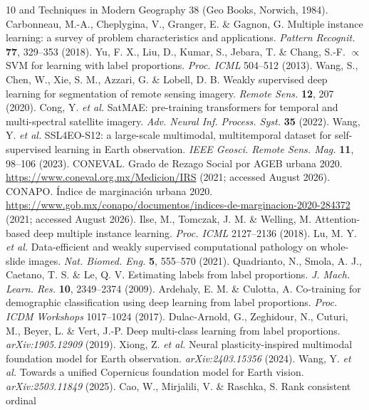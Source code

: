 \documentclass[11pt]{article}
\begin{document}
\begin{thebibliography}{10}
and Techniques in Modern Geography 38 (Geo Books, Norwich, 1984).
 Carbonneau, M.-A., Cheplygina, V., Granger, E. \& Gagnon, G.
Multiple instance learning: a survey of problem characteristics and applications.
\emph{Pattern Recognit.} \textbf{77}, 329--353 (2018).
 Yu, F. X., Liu, D., Kumar, S., Jebara, T. \& Chang, S.-F. $\propto$SVM
for learning with label proportions. \emph{Proc. ICML} 504--512 (2013).
 Wang, S., Chen, W., Xie, S. M., Azzari, G. \& Lobell, D. B. Weakly
supervised deep learning for segmentation of remote sensing imagery. \emph{Remote Sens.}
\textbf{12}, 207 (2020).
 Cong, Y. \emph{et al.} SatMAE: pre-training transformers for temporal
and multi-spectral satellite imagery. \emph{Adv. Neural Inf. Process. Syst.} \textbf{35}
(2022).
 Wang, Y. \emph{et al.} SSL4EO-S12: a large-scale multimodal,
multitemporal dataset for self-supervised learning in Earth observation. \emph{IEEE
Geosci. Remote Sens. Mag.} \textbf{11}, 98--106 (2023).
 CONEVAL. Grado de Rezago Social por AGEB urbana 2020.
\url{https://www.coneval.org.mx/Medicion/IRS} (2021; accessed August 2026).
 CONAPO. \'Indice de marginaci\'on urbana 2020.
\url{https://www.gob.mx/conapo/documentos/indices-de-marginacion-2020-284372} (2021;
accessed August 2026).
 Ilse, M., Tomczak, J. M. \& Welling, M. Attention-based deep multiple
instance learning. \emph{Proc. ICML} 2127--2136 (2018).
 Lu, M. Y. \emph{et al.} Data-efficient and weakly supervised
computational pathology on whole-slide images. \emph{Nat. Biomed. Eng.} \textbf{5},
555--570 (2021).
 Quadrianto, N., Smola, A. J., Caetano, T. S. \& Le, Q. V.
Estimating labels from label proportions. \emph{J. Mach. Learn. Res.} \textbf{10},
2349--2374 (2009).
 Ardehaly, E. M. \& Culotta, A. Co-training for demographic
classification using deep learning from label proportions. \emph{Proc. ICDM Workshops}
1017--1024 (2017).
 Dulac-Arnold, G., Zeghidour, N., Cuturi, M., Beyer, L. \& Vert,
J.-P. Deep multi-class learning from label proportions. \emph{arXiv:1905.12909} (2019).
 Xiong, Z. \emph{et al.} Neural plasticity-inspired multimodal
foundation model for Earth observation. \emph{arXiv:2403.15356} (2024).
 Wang, Y. \emph{et al.} Towards a unified Copernicus foundation
model for Earth vision. \emph{arXiv:2503.11849} (2025).
 Cao, W., Mirjalili, V. \& Raschka, S. Rank consistent ordinal

\end{thebibliography}
\end{document}

